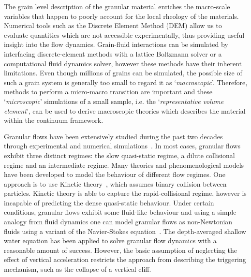 The grain level description of the granular material enriches the 
macro-scale variables that happen to poorly account for the local rheology of 
the materials. Numerical tools such as the Discrete Element Method (DEM) 
allow us to evaluate quantities which are not accessible experimentally, thus 
providing useful insight into the flow dynamics. Grain-fluid interactions can 
be simulated by interfacing discrete-element methods with a lattice 
Boltzmann solver or a computational fluid dynamics solver, however these 
methods have their inherent limitations. Even though millions of grains can be 
simulated, the possible size of such a grain system is generally too small 
to regard it as `\textit{macroscopic}'. Therefore, methods to perform a 
micro-macro transition are important and these `\textit{microscopic}' 
simulations of a small sample, i.e. the `\textit{representative volume 
element}', can be used to derive macroscopic theories which describes the 
material within the continuum framework. 

Granular flows have been extensively studied during the past two decades 
through experimental and numerical 
simulations~\citep{Jaeger1996,Iverson1997a,Denlinger2001,Tang2013,Andersen2010}.
In most cases, granular flows exhibit three distinct regimes: the slow 
quasi-static regime, a dilute collisional regime and an intermediate regime. 
Many theories and phenomenological models have been developed to model the 
behaviour of different flow regimes. One approach is to use Kinetic 
theory~\citep{Jenkins1983, Savage1981}, which assumes binary collision between 
particles. Kinetic theory is able to capture the rapid-collisional regime, 
however is incapable of predicting the dense quasi-static behaviour. Under 
certain conditions, granular 
flows exhibit some fluid-like behaviour and using a simple analogy from fluid 
dynamics one can model granular flows as non-Newtonian fluids using a variant 
of the Navier-Stokes equation~\citep{Savage1991}. The depth-averaged shallow 
water equation has been applied to solve 
granular flow dynamics with a reasonable amount of success. However, the basic 
assumption of neglecting the effect of vertical acceleration restricts the 
approach from describing the triggering mechanism, such as the collapse of a 
vertical cliff.

